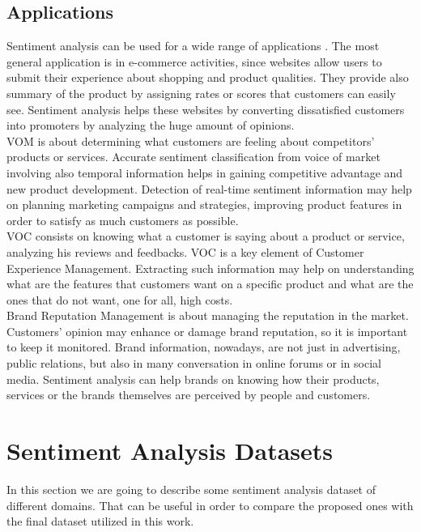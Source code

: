 \subsection{Applications}
Sentiment analysis can be used for a wide range of applications \cite{saifee2013applications}. The most general application is in e-commerce activities, since websites allow users to submit their experience about shopping and product qualities. They provide also summary of the product by assigning rates or scores that customers can easily see. Sentiment analysis helps these websites by converting dissatisfied customers into promoters by analyzing the huge amount of opinions.\\
\ac{VOM} is about determining what customers are feeling about competitors' products or services. Accurate sentiment classification from voice of market involving also temporal information helps in gaining competitive advantage and new product development. Detection of real-time sentiment information may help on planning marketing campaigns and strategies, improving product features in order to satisfy as much customers as possible.\\
\ac{VOC} consists on knowing what a customer is saying about a product or service, analyzing his reviews and feedbacks. \ac{VOC} is a key element of Customer Experience Management. Extracting such information may help on understanding what are the features that customers want on a specific product and what are the ones that do not want, one for all, high costs.\\
Brand Reputation Management is about managing the reputation in the market. Customers' opinion may enhance or damage brand reputation, so it is important to keep it monitored. Brand information, nowadays, are not just in advertising, public relations, but also in many conversation in online forums or in social media. Sentiment analysis can help brands on knowing how their products, services or the brands themselves are perceived by people and customers.





\section{Sentiment Analysis Datasets}
In this section we are going to describe some sentiment analysis dataset of different domains. That can be useful in order to compare the proposed ones with the final dataset utilized in this work.


